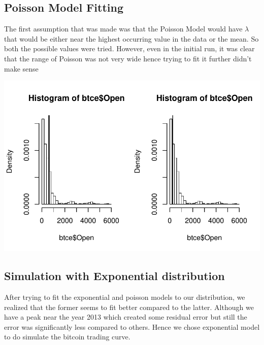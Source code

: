 \documentclass{article}
\begin{document}
\subsection{Poisson Model Fitting}
The first assumption that was made was that the Poisson Model would have $\lambda$ that would be either near the highest occurring value in the data or the mean. So both the possible values were tried. However, even in the initial run, it was clear that the range of Poisson was not very wide hence trying to fit it further didn't make sense
\begin{Schunk}
\end{Schunk}
\includegraphics{Report-005}

\subsection{Simulation with Exponential distribution}
After trying to fit the exponential and poisson models to our distribution, we realized that the former seems to fit better compared to the latter. Although we have a peak near the year 2013 which created some residual error but still the error was significantly less compared to others. Hence we chose exponential model to do simulate the bitcoin trading curve.
\end{document}
